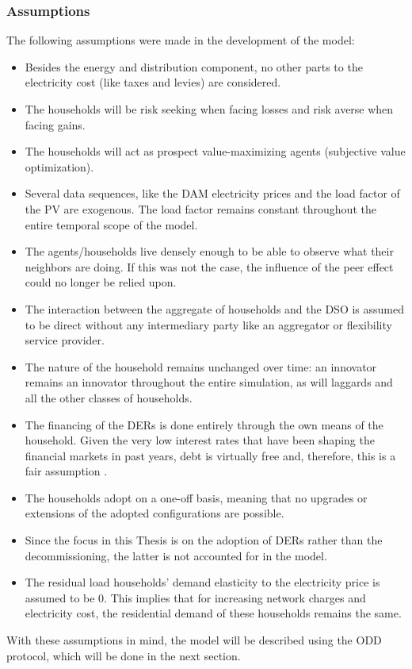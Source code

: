 \subsubsection{Assumptions}
The following assumptions were made in the development of the model:
\begin{itemize} 
    \item Besides the energy and distribution component, no other parts to the electricity cost (like taxes and levies) are considered.
    \item The households will be risk seeking when facing losses and risk averse when facing gains.
    \item The households will act as prospect value-maximizing agents (subjective value optimization).            
    \item Several data sequences, like the DAM electricity prices and the load factor of the PV are exogenous. The load factor remains constant throughout the entire temporal scope of the model.
    \item The agents/households live densely enough to be able to observe what their neighbors are doing. If this was not the case, the influence of the peer effect could no longer be relied upon.
    \item The interaction between the aggregate of households and the DSO is assumed to be direct without any intermediary party like an aggregator or flexibility service provider.
    \item The nature of the household remains unchanged over time: an innovator remains an innovator throughout the entire simulation, as will laggards and all the other classes of households.
    \item The financing of the DERs is done entirely through the own means of the household. Given the very low interest rates that have been shaping the financial markets in past years, debt is virtually free and, therefore, this is a fair assumption \cite{ECB}.
     \item The households adopt on a one-off basis, meaning that no upgrades or extensions of the adopted configurations are possible.
     \item Since the focus in this Thesis is on the adoption of DERs rather than the decommissioning, the latter is not accounted for in the model.
     \item The residual load households' demand elasticity to the electricity price is assumed to be 0. This implies that for increasing network charges and electricity cost, the residential demand of these households remains the same. 
\end{itemize}
With these assumptions in mind, the model will be described using the ODD protocol, which will be done in the next section.
